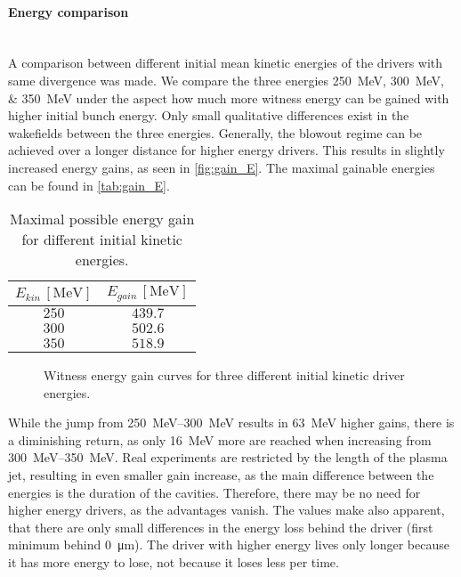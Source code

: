 \documentclass[bachelor_thesis]{subfiles}
\begin{document}
\paragraph*{Energy comparison}\hspace{0pt} \\
A comparison between different initial mean kinetic energies of the drivers with same divergence was made. We compare the three energies \qtylist{250; 300; 350}{\MeV} under the aspect how much more witness energy can be gained with higher initial bunch energy.
Only small qualitative differences exist in the wakefields between the three energies. Generally, the blowout regime can be achieved over a longer distance for higher energy drivers.
This results in slightly increased energy gains, as seen in \autoref{fig:gain_E}. The maximal gainable energies can be found in \autoref{tab:gain_E}.
\begin{table}[h]
\begin{center}
\begin{tabular}{|c|c|} 
	\hline
 	$E_{kin} \, \mathrm{[MeV]}$ & $E_{gain} \, \mathrm{[MeV]}$ \\ 
 	\hline
	$250$ & $439.7$ \\ 
 	$300$ & $502.6$ \\
	$350$ & $518.9$ \\
	\hline
\end{tabular}
\caption{Maximal possible energy gain for different initial kinetic energies.}\label{tab:gain_E}
\end{center}
\end{table}

\begin{figure}
	\centering
	
	\caption{Witness energy gain curves for three different initial kinetic driver energies.}
	\label{fig:gain_E}
\end{figure}

While the jump from \qtyrange{250}{300}{\MeV} results in \qty{63}{\MeV} higher gains, there is a diminishing return, as only \qty{16}{\MeV} more are reached when increasing from \qtyrange{300}{350}{\MeV}. Real experiments are restricted by the length of the plasma jet, 
resulting in even smaller gain increase, as the main difference between the energies is the duration of the cavities. Therefore, there may be no need for higher energy drivers, as the advantages vanish.
The values make also apparent, that there are only small differences in the energy loss behind the driver (first minimum behind \qty{0}{\um}). The driver with higher energy lives only longer because it has more energy to lose, not because it loses less per time.
\end{document}
